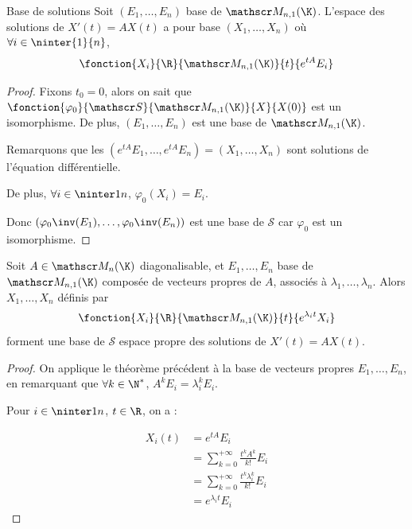 \begin{theoreme}{Base de solutions}{}
    Soit $(E_1, \dots, E_n)$ base de $\mathscr M_{n, 1}(\K)$.
    L'espace des solutions de $X'(t) = A X(t)$ a pour base 
    $(X_1, \dots, X_n)$ où $\forall i \in \ninter{1}{n}$, $$\fonction{X_i}{\R}{\mathscr M_{n, 1}(\K)}{t}{e^{tA} E_i}$$
\end{theoreme}


\begin{proof}
    Fixons $t_0 = 0$, alors on sait que $\fonction{\varphi_0}{\mathscr S}{\mathscr M_{n, 1}(\K)}{X}{X(0)}$ 
    est un isomorphisme. De plus, $(E_1, \dots, E_n)$ est une base de $\mathscr M_{n, 1}(\K)$. 

    Remarquons que les $(e^{tA} E_1, \dots, e^{tA}E_n) = (X_1, \dots, X_n)$ sont solutions de l'équation différentielle.

    De plus, $\forall i \in \ninter 1 n$, $\varphi_0(X_i) = E_i$.

    Donc $(\varphi_0\inv(E_1), \dots, \varphi_0\inv(E_n))$ est une base de $\mathscr S$ car 
    $\varphi_0$ est un isomorphisme.
\end{proof}

\begin{corollaire}{}{}
    Soit $A \in \mathscr M_n(\K)$ diagonalisable, et $E_1, \dots, E_n$ base de $\mathscr M_{n, 1}(\K)$
    composée de vecteurs propres de $A$,
    associés à $\lambda_1, \dots, \lambda_n$. Alors $X_1, \dots, X_n$ définis par 
    $$\fonction{X_i}{\R}{\mathscr M_{n, 1}(\K)}{t}{e^{\lambda_i t} X_i}$$ forment une base 
    de $\mathscr S$ espace propre des solutions de $X'(t) = A X(t)$.
\end{corollaire}


\begin{proof}
    On applique le théorème précédent à la base de vecteurs propres $E_1, \dots, E_n$, en 
    remarquant que $\forall k \in \N^*$, $A^k E_i = \lambda_i^k E_i$.

    Pour $i \in \ninter 1 n$, $t \in \R$, on a : 

    \begin{align}
        X_i(t) & = e^{tA} E_i \\
        & = \sum_{k = 0}^{+ \infty} \frac{t^k A^k}{k!} E_i \\
        & = \sum_{k = 0}^{+ \infty} \frac{t^k \lambda_i^k}{k!} E_i \\
        & = e^{\lambda_i t} E_i
    \end{align}
\end{proof}


